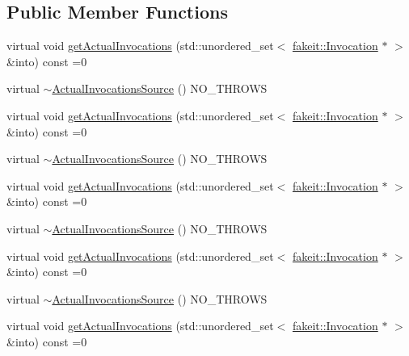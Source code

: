 \subsection*{Public Member Functions}
\begin{DoxyCompactItemize}
\item 
virtual void \mbox{\hyperlink{structfakeit_1_1ActualInvocationsSource_a274de522e11e1f9b8d70c6e0be9e5a9b}{get\+Actual\+Invocations}} (std\+::unordered\+\_\+set$<$ \mbox{\hyperlink{structfakeit_1_1Invocation}{fakeit\+::\+Invocation}} $\ast$ $>$ \&into) const =0
\item 
virtual \mbox{\hyperlink{structfakeit_1_1ActualInvocationsSource_a2c5f7927a0a1ce519d1e96a4d802568e}{$\sim$\+Actual\+Invocations\+Source}} () N\+O\+\_\+\+T\+H\+R\+O\+WS
\item 
virtual void \mbox{\hyperlink{structfakeit_1_1ActualInvocationsSource_a274de522e11e1f9b8d70c6e0be9e5a9b}{get\+Actual\+Invocations}} (std\+::unordered\+\_\+set$<$ \mbox{\hyperlink{structfakeit_1_1Invocation}{fakeit\+::\+Invocation}} $\ast$ $>$ \&into) const =0
\item 
virtual \mbox{\hyperlink{structfakeit_1_1ActualInvocationsSource_a2c5f7927a0a1ce519d1e96a4d802568e}{$\sim$\+Actual\+Invocations\+Source}} () N\+O\+\_\+\+T\+H\+R\+O\+WS
\item 
virtual void \mbox{\hyperlink{structfakeit_1_1ActualInvocationsSource_a274de522e11e1f9b8d70c6e0be9e5a9b}{get\+Actual\+Invocations}} (std\+::unordered\+\_\+set$<$ \mbox{\hyperlink{structfakeit_1_1Invocation}{fakeit\+::\+Invocation}} $\ast$ $>$ \&into) const =0
\item 
virtual \mbox{\hyperlink{structfakeit_1_1ActualInvocationsSource_a2c5f7927a0a1ce519d1e96a4d802568e}{$\sim$\+Actual\+Invocations\+Source}} () N\+O\+\_\+\+T\+H\+R\+O\+WS
\item 
virtual void \mbox{\hyperlink{structfakeit_1_1ActualInvocationsSource_a274de522e11e1f9b8d70c6e0be9e5a9b}{get\+Actual\+Invocations}} (std\+::unordered\+\_\+set$<$ \mbox{\hyperlink{structfakeit_1_1Invocation}{fakeit\+::\+Invocation}} $\ast$ $>$ \&into) const =0
\item 
virtual \mbox{\hyperlink{structfakeit_1_1ActualInvocationsSource_a2c5f7927a0a1ce519d1e96a4d802568e}{$\sim$\+Actual\+Invocations\+Source}} () N\+O\+\_\+\+T\+H\+R\+O\+WS
\item 
virtual void \mbox{\hyperlink{structfakeit_1_1ActualInvocationsSource_a274de522e11e1f9b8d70c6e0be9e5a9b}{get\+Actual\+Invocations}} (std\+::unordered\+\_\+set$<$ \mbox{\hyperlink{structfakeit_1_1Invocation}{fakeit\+::\+Invocation}} $\ast$ $>$ \&into) const =0

\end{DoxyCompactItemize}
